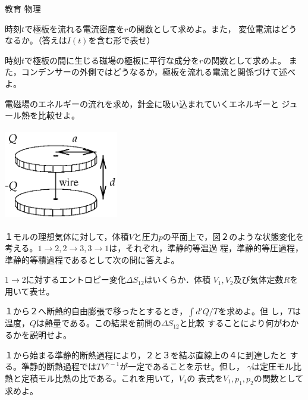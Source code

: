 \documentclass[fleqn]{jbook}
\begin{document}
\begin{question}{教育 物理}{}
\begin{subquestions}
\begin{subsubquestions}
{\SubSubQuestion
 時刻$t$で極板を流れる電流密度を$r$の関数として求めよ。また，
変位電流はどうなるか。（答えは$I(t)$を含む形で表せ）

\SubSubQuestion
 時刻$t$で極板の間に生じる磁場の極板に平行な成分を$r$の関数として求めよ。
また，コンデンサーの外側ではどうなるか，極板を流れる電流と関係づけて述べよ。

\SubSubQuestion
 電磁場のエネルギーの流れを求め，針金に吸い込まれていくエネルギーと
ジュール熱を比較せよ。
}\parbox[t]{60mm}{
\begin{center}
\includegraphics[clip,height=40mm,width=50mm]{1992phys-1.eps}
\end{center}
}
\end{subsubquestions}

\SubQuestion
１モルの理想気体に対して，体積$V$と圧力$p$の平面上で，図２のような状態変化を
考える。$1\rightarrow2,2\rightarrow3,3\rightarrow1$は，それぞれ，準静的等温過
程，準静的等圧過程，準静的等積過程であるとして次の問に答えよ。

\parbox[t]{110mm}{
\begin{subsubquestions}

\SubSubQuestion
 $1\rightarrow2$に対するエントロピー変化$\Delta S_{12}$はいくらか．体積
$V_1,V_2$及び気体定数$R$を用いて表せ。

\SubSubQuestion
 １から２へ断熱的自由膨張で移ったとするとき，$\int d'Q/T$を求めよ。但
し，$T$は温度，$Q$は熱量である。この結果を前問の$\Delta S_{12}$と比較
することにより何がわかるかを説明せよ。

\SubSubQuestion
 １から始まる準静的断熱過程により，２と３を結ぶ直線上の４に到達したと
する。準静的断熱過程では$TV^{\gamma-1}$が一定であることを示せ。但し，
$\gamma$は定圧モル比熱と定積モル比熱の比である。これを用いて，$V_4$の
表式を$V_1,p_1,p_2$の関数として求めよ。


\end{subsubquestions}}
\end{subquestions}
\end{question}
\end{document}
